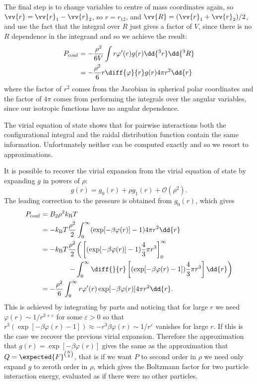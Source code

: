 \documentclass[fleqn]{NotesClass}
\newcommand*{\boltzmann}{k_{\mathrm{B}}}
\newcommand*{\order}{\mathcal{O}}
\begin{document}
    The final step is to change variables to centre of mass coordinates again, so \(\vv{r} = \vv{r}_1 - \vv{r}_2\), so \(r = r_{12}\), and \(\vv{R} = (\vv{r}_1 + \vv{r}_2) / 2\), and use the fact that the integral over \(R\) just gives a factor of \(V\), since there is no \(R\) dependence in the integrand and so we achieve the result:
    \begin{align}
        P_{\mathrm{conf}} &= -\frac{\rho^2}{6V} \int r \varphi'(r) g(r) \dd{^3r} \dd{^3R}\\
        &= -\frac{\rho^2}{6} r \diff{\varphi}{r} g(r) 4\pi r^2 \dd{r}
    \end{align}
    where the factor of \(r^2\) comes from the Jacobian in spherical polar coordinates and the factor of \(4\pi\) comes from performing the integrals over the angular variables, since our isotropic functions have no angular dependence.
    
    The virial equation of state shows that for pairwise interactions both the configurational integral and the raidal distribution function contain the same information.
    Unfortunately neither can be computed exactly and so we resort to approximations.
    
    It is possible to recover the virial expansion from the virial equation of state by expanding \(g\) in powers of \(\rho\):
    \begin{equation}
        g(r) = g_0(r) + \rho g_1(r) + \order(\rho^2).
    \end{equation}
    The leading correction to the pressure is obtained from \(g_0(r)\), which gives
    \begin{align}
        P_{\mathrm{conf}} &= B_2 \rho^2 \boltzmann T\\
        &= -\boltzmann T\frac{\rho^2}{2} \int_{0}^{\infty} (\exp[-\beta \varphi(r)] - 1) 4\pi r^2 \dd{r}\\
        &= -\boltzmann T\frac{\rho^2}{2} \bigg( \left[(\exp[-\beta \varphi(r)] - 1)\frac{4}{3}\pi r^3 \right]_{0}^{\infty}\notag\\
        &\qquad\qquad- \int_0^\infty \diff{}{r}\left[(\exp[-\beta \varphi(r) - 1]) \frac{4}{3}\pi r^3 \right] \dd{r} \bigg)\\
        &= -\frac{\rho^2}{6} \int_{0}^{\infty} r \varphi'(r) \exp[-\beta\varphi(r)] 4\pi r^2 \dd{r}.
    \end{align}
    This is achieved by integrating by parts and noticing that for large \(r\) we need \(\varphi(r) \sim 1/r^{3 + \varepsilon}\) for some \(\varepsilon > 0\) so that \(r^3(\exp[-\beta\varphi(r) - 1]) \approx -r^3\beta\varphi(r) \sim 1/r^\varepsilon\) vanishes for large \(r\).
    If this is the case we recover the previous virial expansion.
    Therefore the approximation that \(g(r) = \exp[-\beta\varphi(r)]\) gives the same as the approximation that \(Q = \expected{F}^{\binom{N}{2}}\), that is if we want \(P\) to second order in \(\rho\) we need only expand \(g\) to zeroth order in \(\rho\), which gives the Boltzmann factor for two particle interaction energy, evaluated as if there were no other particles.
    
\end{document}
